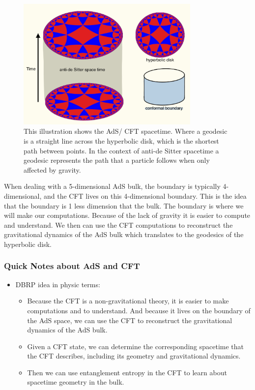 \documentclass[12pt]{article}
\begin{document}
    \begin{figure}[htbp]  %
        \centering
        \includegraphics[width=0.8\textwidth]{ads_cft.jpeg}  %
        \caption{This illustration shows the AdS/ CFT spacetime. Where a geodesic is a straight line across the hyperbolic disk, which is the shortest path between points. In the context of anti-de Sitter spacetime a geodesic represents the path that a particle follows when only affected by gravity.}  %
        \label{fig:example}  %
    \end{figure}

    When dealing with a 5-dimensional AdS bulk, the boundary is typically 4-dimensional, and the CFT lives on this 4-dimensional boundary. This is the idea that the boundary is 1 less dimension that the bulk. 
    The boundary is where we will make our computations. Because of the lack of gravity it is easier to compute and understand. We then can use the CFT computations to reconstruct the gravitational dynamics of the AdS bulk which translates to the geodesics of the hyperbolic disk. 
    \subsubsection*{Quick Notes about AdS and CFT}
    \begin{itemize}
        \item DBRP idea in physic terms:
        \begin{itemize}
            \item Because the CFT is a non-gravitational theory, it is easier to make computations and to understand. And because it lives on the boundary of the AdS space, we can use the CFT to reconstruct the gravitational dynamics of the AdS bulk.
            \item Given a CFT state, we can determine the corresponding spacetime that the CFT describes, including its geometry and gravitational dynamics.
            \item Then we can use entanglement entropy in the CFT to learn about spacetime geometry in the bulk.
        \end{itemize}
    \end{itemize}
\end{document}
